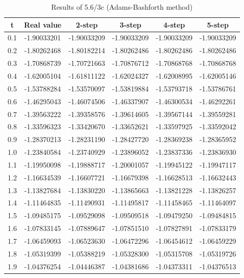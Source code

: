 \documentclass{article}
\begin{document}
    \begin{table}[htbp]
    \centering
    \caption{Results of 5.6/3c (Adams-Bashforth method)}
    \begin{tabular}{c|c|c|c|c|c}
    \toprule
    t& \textbf{Real value} & \textbf{2-step} & \textbf{3-step} & \textbf{4-step} & \textbf{5-step}\\ 
    \midrule
    0.1 & -1.90033201 &-1.90033209 &-1.90033209 & -1.90033209 & -1.90033209\\
    0.2 & -1.80262468 &-1.80182214 &-1.80262486 & -1.80262486 & -1.80262486\\
    0.3 & -1.70868739 &-1.70721663 &-1.70876712 & -1.70868768 & -1.70868768\\
    0.4 & -1.62005104 &-1.61811122 &-1.62024327 & -1.62008995 & -1.62005146\\
    0.5 & -1.53788284 &-1.53570097 &-1.53819884 & -1.53793718 & -1.53786761\\
    0.6 & -1.46295043 &-1.46074506 &-1.46337907 & -1.46300534 & -1.46292261\\
    0.7 & -1.39563222 &-1.39358576 &-1.39614605 & -1.39567144 & -1.39559281\\
    0.8 & -1.33596323 &-1.33420670 &-1.33652621 & -1.33597925 & -1.33592042\\
    0.9 & -1.28370213 &-1.28231190 &-1.28427720 & -1.28369238 & -1.28365952\\
    1.0 & -1.23840584 &-1.23740929 &-1.23896052 & -1.23837336 & -1.23836930\\
    1.1 & -1.19950098 &-1.19888717 &-1.20001057 & -1.19945122 & -1.19947117\\
    1.2 & -1.16634539 &-1.16607721 &-1.16679398 & -1.16628513 & -1.16632443\\
    1.3 & -1.13827684 &-1.13830220 &-1.13865663 & -1.13821228 & -1.13826257\\
    1.4 & -1.11464835 &-1.11490931 &-1.11495817 & -1.11458465 & -1.11464097\\
    1.5 & -1.09485175 &-1.09529098 &-1.09509518 & -1.09479250 & -1.09484815\\
    1.6 & -1.07833145 &-1.07889647 &-1.07851510 & -1.07827891 & -1.07833179\\
    1.7 & -1.06459093 &-1.06523630 &-1.06472296 & -1.06454612 & -1.06459229\\
    1.8 & -1.05319399 &-1.05388219 &-1.05328300 & -1.05315708 & -1.05319726\\
    1.9 & -1.04376254 &-1.04446387 &-1.04381686 & -1.04373311 & -1.04376513\\
    \bottomrule
    \end{tabular}
    \end{table}
\end{document}
